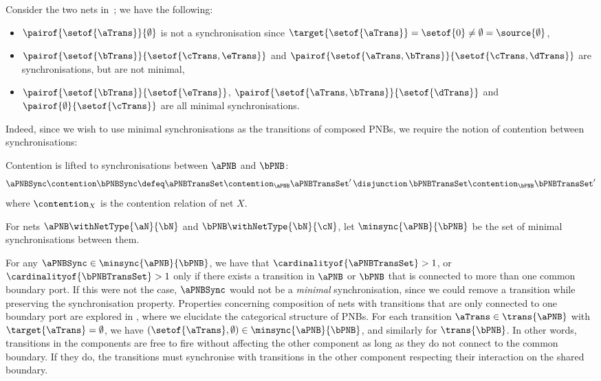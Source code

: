 \begin{example}
    Consider the two nets in~; we have the
    following:
    \begin{itemize}
        \item $\pairof{\setof{\aTrans}}{\emptyset}$ is not a
            synchronisation since $\target{\setof{\aTrans}} = \setof{0} \neq
            \emptyset = \source{\emptyset}$,
        \item $\pairof{\setof{\bTrans}}{\setof{\cTrans,\eTrans}}$ and
            $\pairof{\setof{\aTrans, \bTrans}}{\setof{\cTrans, \dTrans}}$ are
            synchronisations, but are not minimal,
        \item $\pairof{\setof{\bTrans}}{\setof{\eTrans}}$,
            $\pairof{\setof{\aTrans, \bTrans}}{\setof{\dTrans}}$ and
            $\pairof{\emptyset}{\setof{\cTrans}}$ are all minimal
            synchronisations.
    \end{itemize}
\end{example}

Indeed, since we wish to use minimal synchronisations as the transitions of
composed PNBs, we require the notion of contention between synchronisations:

\begin{definition}\label{defn:synchcontention}
    Contention is lifted to synchronisations between $\aPNB$ and $\bPNB$:
    \[
        \aPNBSync \contention \bPNBSync \defeq \aPNBTransSet \contention_\aPNB
        \aPNBTransSet' \, \disjunction\, \bPNBTransSet \contention_\bPNB
        \bPNBTransSet'
    \]
    where $\contention_X$ is the contention relation of net $X$.
\end{definition}

For nets $\aPNB \withNetType{\aN}{\bN}$ and $\bPNB \withNetType{\bN}{\cN}$, let
$\minsync{\aPNB}{\bPNB}$ be the set of minimal synchronisations between them.

\begin{remark}
    For any $\aPNBSync \in \minsync{\aPNB}{\bPNB}$, we have that
    $\cardinalityof{\aPNBTransSet} > 1$, or $\cardinalityof{\bPNBTransSet} > 1$
    only if there exists a transition in $\aPNB$ or $\bPNB$ that is connected
    to more than one common boundary port. If this were not the case,
    $\aPNBSync$ would not be a \emph{minimal} synchronisation, since we could
    remove a transition while preserving the synchronisation property.
    Properties concerning composition of nets with transitions that are only
    connected to one boundary port are explored in ,
    where we elucidate the categorical structure of PNBs. For each transition
    $\aTrans \in \trans{\aPNB}$ with $\target{\aTrans} = \emptyset$, we have
    $(\setof{\aTrans}, \emptyset) \in \minsync{\aPNB}{\bPNB}$, and similarly
    for $\trans{\bPNB}$. In other words, transitions in the components are free
    to fire without affecting the other component as long as they do not
    connect to the common boundary. If they do, the transitions must
    synchronise with transitions in the other component respecting their
    interaction on the shared boundary.
\end{remark}

